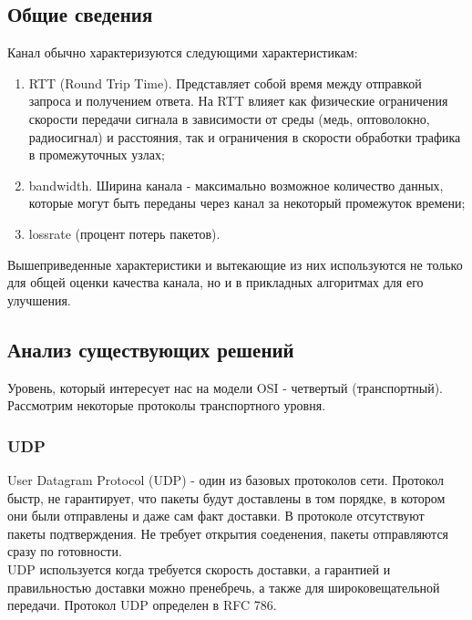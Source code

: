 \documentclass[14pt, a4paper]{extarticle}
\begin{document}
\subsection{Общие сведения}
Канал обычно характеризуются следующими характеристикам:
\begin{enumerate}
	\item RTT (Round Trip Time). Представляет собой время между отправкой запроса и получением ответа. На RTT влияет как физические ограничения скорости передачи 	сигнала в зависимости от среды (медь, оптоволокно, радиосигнал) и расстояния, так и ограничения в скорости обработки трафика в промежуточных узлах;
	\item bandwidth. Ширина канала - максимально возможное количество данных, которые могут быть переданы через канал за некоторый промежуток времени;
	\item lossrate (процент потерь пакетов).
\end{enumerate}
\indent \indent Вышеприведенные характеристики и вытекающие из них используются не только для общей оценки качества канала, но и в прикладных алгоритмах для его улучшения.

\subsection{Анализ существующих решений}
Уровень, который интересует нас на модели OSI - четвертый (транспортный). \\
Рассмотрим некоторые протоколы транспортного уровня.

\subsubsection{UDP}
User Datagram Protocol (UDP) - один из базовых протоколов сети. Протокол быстр, не гарантирует, что пакеты будут доставлены в том порядке, в котором они были отправлены и даже сам факт доставки. В протоколе отсутствуют пакеты подтверждения. Не требует открытия соеденения, пакеты отправляются сразу по готовности.\\
\indent  UDP используется когда требуется скорость доставки, а гарантией и правильностью доставки можно пренебречь, а также для широковещательной передачи. Протокол UDP определен в RFC 786.
\end{document}
